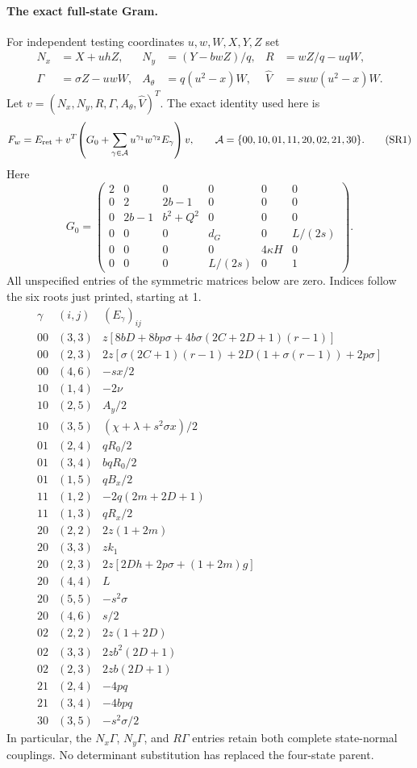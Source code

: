 \paragraph{The exact full-state Gram.}
For independent testing coordinates $u,w,W,X,Y,Z$ set
\[
\begin{aligned}
 N_x&=X+uhZ,&N_y&=(Y-bwZ)/q,&R&=wZ/q-uqW,\\
 \Gamma&=\sigma Z-uwW,& A_\theta&=q(u^2-x)W,
 &\widehat V&=suw(u^2-x)W.
\end{aligned}
\]
Let $v=(N_x,N_y,R,\Gamma,A_\theta,\widehat V)^T$.
The exact identity used here is
\[
 F_w=E_{\rm ret}+v^T\!\left(G_0+
                  \sum_{\gamma\in\mathcal A}u^{\gamma_1}w^{\gamma_2}E_\gamma
                          \right)v,\qquad
 \mathcal A=\{00,10,01,11,20,02,21,30\}.
 \tag{SR1}
\]
Here
\[
G_0=\begin{pmatrix}
2&0&0&0&0&0\\
0&2&2b-1&0&0&0\\
0&2b-1&b^2+Q^2&0&0&0\\
0&0&0&d_G&0&L/(2s)\\
0&0&0&0&4\kappa H&0\\
0&0&0&L/(2s)&0&1
\end{pmatrix}.
\]
All unspecified entries of the symmetric matrices below are zero.
Indices follow the six roots just printed, starting at 1.
\[
\begin{array}{c|c|l}
\gamma&(i,j)&(E_\gamma)_{ij}\\\hline
00&(3,3)&z[8bD+8bp\sigma+4b\sigma(2C+2D+1)(r-1)]\\
00&(2,3)&2z[\sigma(2C+1)(r-1)+2D(1+\sigma(r-1))+2p\sigma]\\
00&(4,6)&-sx/2\\\hline
10&(1,4)&-2\nu\\
10&(2,5)&A_y/2\\
10&(3,5)&(\chi+\lambda+s^2\sigma x)/2\\\hline
01&(2,4)&qR_0/2\\
01&(3,4)&bqR_0/2\\
01&(1,5)&qB_x/2\\\hline
11&(1,2)&-2q(2m+2D+1)\\
11&(1,3)&qR_x/2\\\hline
20&(2,2)&2z(1+2m)\\
20&(3,3)&zk_1\\
20&(2,3)&2z[2Dh+2p\sigma+(1+2m)g]\\
20&(4,4)&L\\
20&(5,5)&-s^2\sigma\\
20&(4,6)&s/2\\\hline
02&(2,2)&2z(1+2D)\\
02&(3,3)&2zb^2(2D+1)\\
02&(2,3)&2zb(2D+1)\\\hline
21&(2,4)&-4pq\\
21&(3,4)&-4bpq\\\hline
30&(3,5)&-s^2\sigma/2
\end{array}
\tag{SR2}
\]
In particular, the $N_x\Gamma$, $N_y\Gamma$, and $R\Gamma$
entries retain both complete state-normal couplings. No determinant
substitution has replaced the four-state parent.

